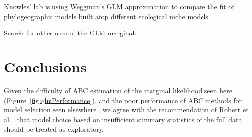 Knowles' lab is using Weggman's GLM approximation to compare the fit of
phylogeographic models built atop different ecological niche models.

Search for other uses of the GLM marginal.

\section{Conclusions}

Given the difficulty of ABC estimation of the marginal likelihood seen here
(Figure~\ref{fig:glmPerformance}), and the poor performance of ABC methods for
model selection seen elsewhere \citep{Robert2011,Oaks2012,Oaks2014reply}, we
agree with the recommendation of Robert et al.\ \citeyear{Robert2011} that
model choice based on insufficient summary statistics of the full data should
be treated as exploratory.

